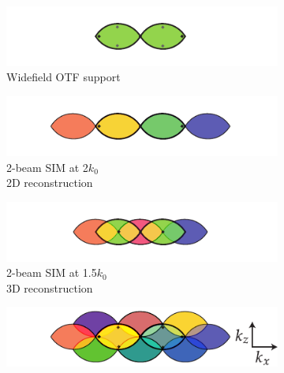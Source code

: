 \begin{figure}
    \centering
    \begin{subfigure}[t]{0.48\textwidth}
        \centering
        \includegraphics[width=1\linewidth]{./sim/axial_otf}
        \caption{Widefield OTF support}
        \label{fig:sim_axial_otf}
    \end{subfigure}\hfill
    \begin{subfigure}[t]{0.48\textwidth}
        \centering
        \includegraphics[width=1\linewidth]{./sim/axial_2_beam_2d}
        \caption{2-beam SIM at \SI{2}{\times}$k_0$\\2D reconstruction}
        \label{fig:sim_axial_2_beam_2d}
    \end{subfigure}
    \begin{subfigure}[t]{0.48\textwidth}
        \centering
        \includegraphics[width=\linewidth]{./sim/axial_2_beam_3d}
        \caption{2-beam SIM at \SI{1.5}{\times}$k_0$\\3D reconstruction}
        \label{fig:sim_axial_2_beam_3d}
    \end{subfigure}
    \begin{subfigure}[t]{0.48\textwidth}
        \centering
        \includegraphics[width=1\linewidth]{./sim/axial_3_beam}

\end{subfigure}
\end{figure}
